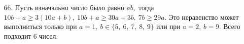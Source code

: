 66. Пусть изначально число было равно  $\overline{ab},$ тогда $10b+a\geqslant3(10a+b),\ 10b+a\geqslant30a+3b,\ 7b\geqslant29a.$ Это неравенство может выполниться только при $a=1,\ b\in\{5,\ 6,\ 7,\ 8,\ 9\}$ или при $a=2,\ b=9.$ Всего подходит 6 чисел.\\
